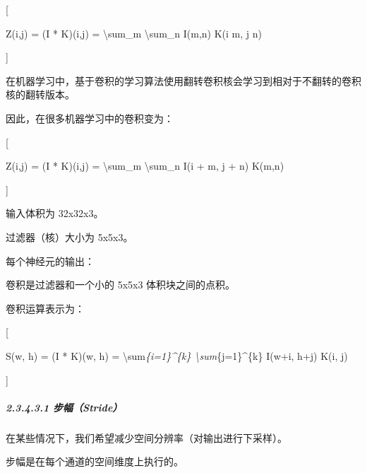 {[}

Z(i,j) = (I * K)(i,j) = \textbackslash sum\_m \textbackslash sum\_n
I(m,n) K(i m, j n)

{]}


在机器学习中，基于卷积的学习算法使用翻转卷积核会学习到相对于不翻转的卷积核的翻转版本。

因此，在很多机器学习中的卷积变为：

{[}

Z(i,j) = (I * K)(i,j) = \textbackslash sum\_m \textbackslash sum\_n I(i
+ m, j + n) K(m,n)

{]}




输入体积为 32x32x3。

过滤器（核）大小为 5x5x3。

每个神经元的输出：

卷积是过滤器和一个小的 5x5x3 体积块之间的点积。

卷积运算表示为：

{[}

S(w, h) = (I * K)(w, h) = \textbackslash sum\emph{\{i=1\}\^{}\{k\}
\textbackslash sum}\{j=1\}\^{}\{k\} I(w+i, h+j) K(i, j)

{]}


\subparagraph{\texorpdfstring{\textbf{2.3.4.3.1
步幅（Stride）}}{2.3.4.3.1 步幅（Stride）}}\label{23431-ux6b65ux5e45stride}

在某些情况下，我们希望减少空间分辨率（对输出进行下采样）。

步幅是在每个通道的空间维度上执行的。


